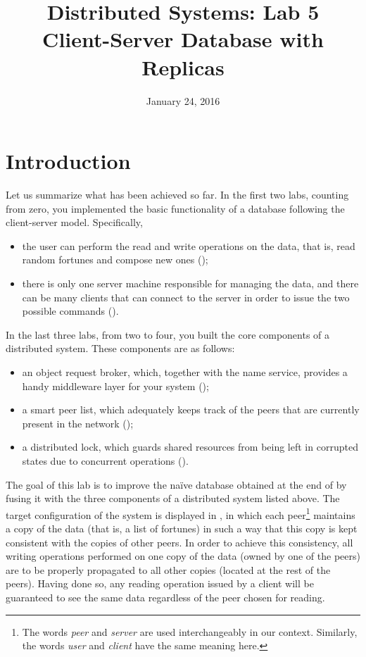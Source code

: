 \documentclass[a4paper]{article}
\title{Distributed Systems: Lab 5\\Client-Server Database with Replicas}
\author{}
\date{January 24, 2016}
\begin{document}
\maketitle

\section{Introduction}

Let us summarize what has been achieved so far. In the first two labs, counting
from zero, you implemented the basic functionality of a database following the
client-server model. Specifically,
\begin{itemize}

  \item the user can perform the read and write operations on the data, that is,
  read random fortunes and compose new ones ();

  \item there is only one server machine responsible for managing the data, and
  there can be many clients that can connect to the server in order to issue the
  two possible commands ().

\end{itemize}
In the last three labs, from two to four, you built the core components of a
distributed system. These components are as follows:
\begin{itemize}

  \item an object request broker, which, together with the name service,
  provides a handy middleware layer for your system ();

  \item a smart peer list, which adequately keeps track of the peers that are
  currently present in the network ();

  \item a distributed lock, which guards shared resources from being left in
  corrupted states due to concurrent operations ().

\end{itemize}
The goal of this lab is to improve the na\"{i}ve database obtained at the end of
 by fusing it with the three components of a distributed system listed
above. The target configuration of the system is displayed in
, in which each peer\footnote{The words \emph{peer}
and \emph{server} are used interchangeably in our context. Similarly, the words
\emph{user} and \emph{client} have the same meaning here.} maintains a copy of
the data (that is, a list of fortunes) in such a way that this copy is kept
consistent with the copies of other peers. In order to achieve this consistency,
all writing operations performed on one copy of the data (owned by one of the
peers) are to be properly propagated to all other copies (located at the rest of
the peers). Having done so, any reading operation issued by a client will be
guaranteed to see the same data regardless of the peer chosen for reading.
\end{document}
